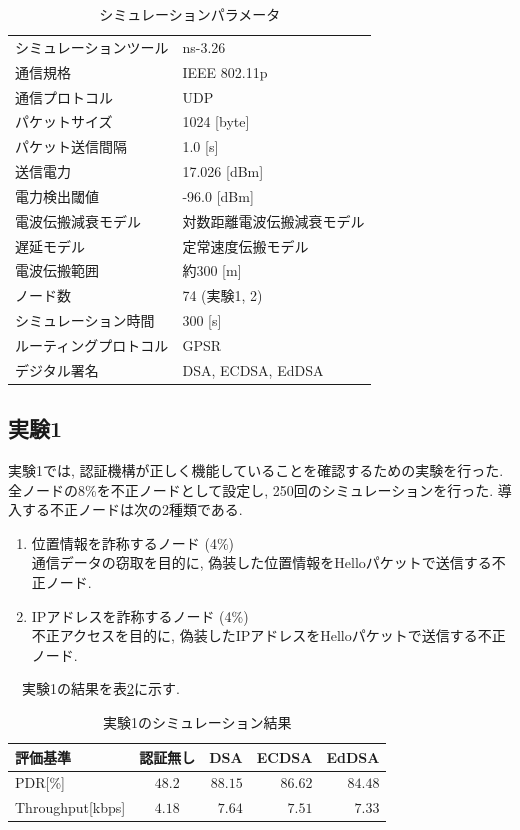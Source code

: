\documentclass[a4j,9pt,twocolumn]{jsarticle}
\begin{document}
\begin{table}[h]
  \centering
  \caption{シミュレーションパラメータ}
  \label{tab:parameter}
  \begin{tabular}{ll} \hline
    シミュレーションツール & ns-3.26 \\
    通信規格 & IEEE 802.11p \\
    通信プロトコル & UDP \\
    パケットサイズ & 1024 [byte] \\
    パケット送信間隔 & 1.0 [s] \\
    送信電力 & 17.026 [dBm] \\
    電力検出閾値 & -96.0 [dBm] \\
    電波伝搬減衰モデル & 対数距離電波伝搬減衰モデル \\
    遅延モデル & 定常速度伝搬モデル \\
    電波伝搬範囲 & 約300 [m] \\
    ノード数 & 74 (実験1, 2)\\
    シミュレーション時間 & 300 [s] \\
    ルーティングプロトコル & GPSR \\
    デジタル署名 & DSA, ECDSA, EdDSA \\ \hline
  \end{tabular}
\end{table}
\subsection{実験1}
実験1では, 認証機構が正しく機能していることを確認するための実験を行った. 
全ノードの8\%を不正ノードとして設定し, 250回のシミュレーションを行った. 
導入する不正ノードは次の2種類である. 
\begin{enumerate}
    \item 位置情報を詐称するノード (4\%)\\
    通信データの窃取を目的に, 偽装した位置情報をHelloパケットで送信する不正ノード. 
    \item IPアドレスを詐称するノード (4\%)\\
    不正アクセスを目的に, 偽装したIPアドレスをHelloパケットで送信する不正ノード. 
\end{enumerate}
\medskip
　実験1の結果を表\ref{tab:exp1}に示す.
\begin{table}[h]
    \centering
    \caption{実験1のシミュレーション結果}
    \label{tab:exp1} 
    \begin{tabular}{l|crrr} \hline
        評価基準 & 認証無し & DSA & ECDSA & EdDSA \\ \hline \hline
        PDR[\%] & $48.2$ & $88.15$ & $86.62$ & $84.48$ \\
        Throughput[kbps] & $4.18$ & $7.64$ & $7.51$ & $7.33$ \\ \hline
    \end{tabular}
\end{table}
\end{document}
